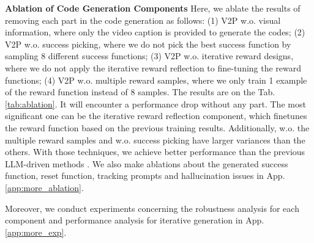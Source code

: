 \textbf{Ablation of Code Generation Components} Here, we ablate the results of removing each part in the code generation as follows: (1) V2P w.o. visual information, where only the video caption is provided to generate the codes; (2) V2P w.o. success picking, where we do not pick the best success function by sampling 8 different success functions; (3) V2P w.o. iterative reward designs, where we do not apply the iterative reward reflection to fine-tuning the reward functions; (4) V2P w.o. multiple reward samples, where we only train 1 example of the reward function instead of 8 samples. The results are on the Tab. \ref{tab:ablation}. It will encounter a performance drop without any part. The most significant one can be the iterative reward reflection component, which finetunes the reward function based on the previous training results. Additionally, w.o. the multiple reward samples and w.o. success picking have larger variances than the others. With those techniques, we achieve better performance than the previous LLM-driven methods \citep{ma2023eureka, wang2023robogen}.
We also make ablations about the generated success function, reset function, tracking prompts and hallucination issues in App. \ref{app:more_ablation}.

Moreover, we conduct experiments concerning the robustness analysis for each component and performance analysis for iterative generation in App. \ref{app:more_exp}.

